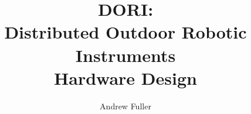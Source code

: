 
\title{\large DORI:\\
       Distributed Outdoor Robotic Instruments \\[0.4cm]
       Hardware Design}
       
\author{Andrew Fuller}
\qualification{}



\beforepreface

